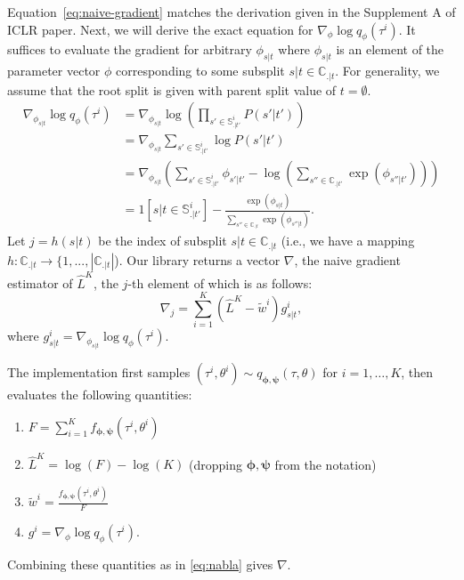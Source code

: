 \documentclass{article}
\begin{document}
Equation~\ref{eq:naive-gradient} matches the derivation given in the Supplement A of ICLR paper.
Next, we will derive the exact equation for $\nabla_{\phi} \log q_{\phi}(\tau^i)$.
It suffices to evaluate the gradient for arbitrary $\phi_{s|t}$ where $\phi_{s|t}$ is an element of the parameter vector $\phi$ corresponding to some subsplit $s|t \in \mathbb{C}_{.|t}$.
For generality, we assume that the root split is given with parent split value of $t = \emptyset$.
\begin{align*}
    \nabla_{\phi_{s|t}} \log q_{\phi}(\tau^i) &= \nabla_{\phi_{s|t}} \log \left(\prod_{s' \in \mathbb{S}_{.|t'}^i} P(s' | t') \right) \\
    &= \nabla_{\phi_{s|t}} \sum\limits_{s' \in \mathbb{S}_{.|t'}^i} \log P(s' | t') \\
    &= \nabla_{\phi_{s|t}} \left(\sum\limits_{s' \in \mathbb{S}_{.|t'}^i} \phi_{s' | t'} - \log\left(\sum\limits_{s'' \in \mathbb{C}_{.|t'}} \exp(\phi_{s''|t'})\right)\right) \\
    &= 1[s|t \in \mathbb{S}^{i}_{.|t'}] - \frac{\exp(\phi_{s|t})}{\sum\limits_{s'' \in \mathbb{C}_{.|t}} \exp(\phi_{s''|t})}.
\end{align*}
Let $j = h(s|t)$ be the index of subsplit $s|t \in \mathbb{C}_{.|t}$ (i.e., we have a mapping $h : \mathbb{C}_{.|t} \to \{1, ..., |\mathbb{C}_{.|t}|$).
Our library returns a vector $\nabla$, the naive gradient estimator of $\hat{L}^K$, the $j$-th element of which is as follows:
\begin{equation}\label{eq:nabla}
    \nabla_j = \sum\limits_{i=1}^{K} (\hat{L}^K - \tilde{w}^i) g_{s|t}^i,
\end{equation}
where $g_{s|t}^i = \nabla_{\phi_{s|t}} \log q_{\phi}(\tau^i)$.

The implementation first samples $(\tau^i, \theta^i) \sim q_{\bm{\phi}, \bm{\psi}}(\tau, \theta)$ for $i = 1, \ldots, K$, then evaluates the following quantities:
\begin{enumerate}
    \item $F = \sum_{i=1}^{K} f_{\bm{\phi},\bm{\psi}}(\tau^i, \theta^i)$
    \item $\hat{L}^{K} = \log(F) - \log(K)$ (dropping $\bm{\phi}, \bm{\psi}$ from the notation)
    \item $\tilde{w}^i = \frac{f_{\bm{\phi},\bm{\psi}}(\tau^i, \theta^i)}{F}$
    \item $g^i = \nabla_{\phi} \log q_{\phi}(\tau^i)$.
\end{enumerate}
Combining these quantities as in \eqref{eq:nabla} gives $\nabla$.
\end{document}
